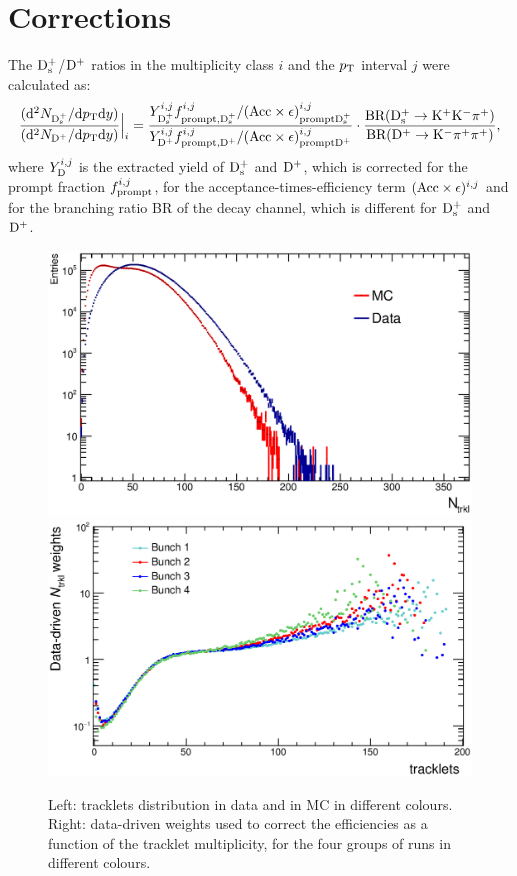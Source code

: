 \section{Corrections}
\label{sec:Corrections}
The ${\rm D_s^+}$/${\rm D^+}$ ratios in the multiplicity class $i$ and the $p_{\rm T}$ interval $j$ were calculated
as:
\begin{equation} 
\label{eq:NtrklCorr}
 \frac{({\rm d}^2N_{{\rm D_s^+}}/{\rm d}p_{\rm T} {\rm d}y)}{({\rm d}^2N_{{\rm D^+}}/{\rm d}p_{\rm T} {\rm d}y)} \Big |_i = \frac{Y^{i, j}_{{\rm D_s^+}}  f^{i, j}_{\rm prompt, {\rm D_s^+}} / ({\rm Acc} \times \epsilon)^{i, j}_{\rm prompt {\rm D_s^+}}}{Y^{i, j}_{{\rm D^+}}  f^{i, j}_{\rm prompt, {\rm D^+}} / ({\rm Acc} \times \epsilon)^{i, j}_{\rm prompt {\rm D^+}}} \cdot \frac{\rm BR({\rm D^{+}_\mathrm{s}\to K^+ K^-\pi^+})}{\rm BR({\rm D}^+\to {\rm K}^-\pi^+\pi^+)},
\end{equation}
where $Y^{i, j}_{\rm D}$ is the extracted yield of ${\rm D_s^+}$ and ${\rm D^+}$, which is corrected for the prompt fraction
$f^{i, j}_{\rm prompt}$, for the acceptance-times-efficiency term $({\rm Acc} \times \epsilon)^{i, j}$ and for
the branching ratio BR of the decay channel, which is different for ${\rm D_s^+}$ and ${\rm D^+}$.\\


\begin{figure}[!h]
\centering
 \includegraphics[width=.49\textwidth]{FigCap6/NtrkDistrDDataMC.eps}
 \includegraphics[width=.49\textwidth]{FigCap6/NtrklWeightsMC_4bunches.eps}
 \caption{Left: tracklets distribution in data and in MC in different colours. Right: data-driven weights used to correct the efficiencies as a function of the tracklet multiplicity, for the four groups of runs in different colours.}
 \label{fig:NtrklDataMC}
\end{figure}

